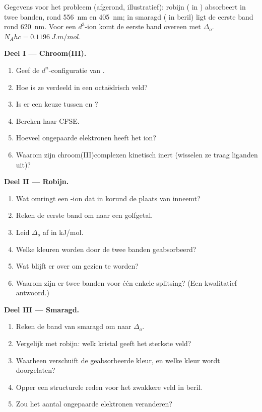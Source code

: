 \begin{problem}
\label{pb:b2:ligand-field:1}
Gegevens voor het probleem (afgerond, illustratief): robijn ( in ) absorbeert
in twee banden, rond \qty{556}{nm} en \qty{405}{nm}; in smaragd ( in beril) ligt de
eerste band rond \qty{620}{nm}. Voor een $d^3$-ion komt de eerste band overeen met
$\Delta_o$. $N_Ahc = \qty{0.1196}{J.m/mol}$.

\medskip
\noindent\textbf{Deel I --- Chroom(III).}
\begin{enumerate}
  \item Geef de $d^n$-configuratie van .
  \item Hoe is ze verdeeld in een octaëdrisch veld?
  \item Is er een keuze tussen  en ?
  \item Bereken haar CFSE.
  \item Hoeveel ongepaarde elektronen heeft het ion?
  \item Waarom zijn chroom(III)complexen kinetisch inert (wisselen ze traag liganden uit)?
\end{enumerate}

\medskip
\noindent\textbf{Deel II --- Robijn.}
\begin{enumerate}[resume]
  \item Wat omringt een -ion dat in korund de plaats van  inneemt?
  \item Reken de eerste band om naar een golfgetal.
  \item Leid $\Delta_o$ af in \unit{kJ/mol}.
  \item Welke kleuren worden door de twee banden geabsorbeerd?
  \item Wat blijft er over om gezien te worden?
  \item Waarom zijn er twee banden voor één enkele splitsing? (Een kwalitatief antwoord.)
\end{enumerate}

\medskip
\noindent\textbf{Deel III --- Smaragd.}
\begin{enumerate}[resume]
  \item Reken de band van smaragd om naar $\Delta_o$.
  \item Vergelijk met robijn: welk kristal geeft het sterkste veld?
  \item Waarheen verschuift de geabsorbeerde kleur, en welke kleur wordt doorgelaten?
  \item Opper een structurele reden voor het zwakkere veld in beril.
  \item Zou het aantal ongepaarde elektronen veranderen?
\end{enumerate}


\end{problem}
